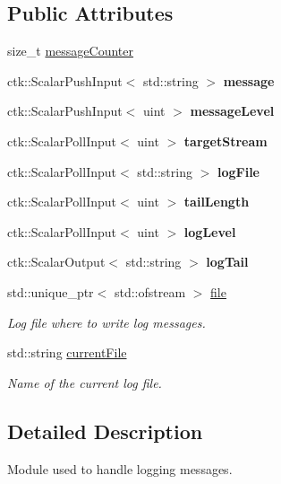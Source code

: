 \subsection*{Public Attributes}
\begin{DoxyCompactItemize}
\item 
size\+\_\+t \hyperlink{structLoggingModule_a30626e4224e872a8b8ea94f4b3df810f}{message\+Counter}
\item 
ctk\+::\+Scalar\+Push\+Input$<$ std\+::string $>$ {\bfseries message}
\item 
ctk\+::\+Scalar\+Push\+Input$<$ uint $>$ {\bfseries message\+Level}
\item 
ctk\+::\+Scalar\+Poll\+Input$<$ uint $>$ {\bfseries target\+Stream}
\item 
ctk\+::\+Scalar\+Poll\+Input$<$ std\+::string $>$ {\bfseries log\+File}
\item 
ctk\+::\+Scalar\+Poll\+Input$<$ uint $>$ {\bfseries tail\+Length}
\item 
ctk\+::\+Scalar\+Poll\+Input$<$ uint $>$ {\bfseries log\+Level}
\item 
ctk\+::\+Scalar\+Output$<$ std\+::string $>$ {\bfseries log\+Tail}
\item 
std\+::unique\+\_\+ptr$<$ std\+::ofstream $>$ \hyperlink{structLoggingModule_a600659a6a9219f9123ae1fd7b2f43826}{file}\hypertarget{structLoggingModule_a600659a6a9219f9123ae1fd7b2f43826}{}\label{structLoggingModule_a600659a6a9219f9123ae1fd7b2f43826}

\begin{DoxyCompactList}\small\item\em Log file where to write log messages. \end{DoxyCompactList}\item 
std\+::string \hyperlink{structLoggingModule_adcc76afe247ea00966077346c10258eb}{current\+File}\hypertarget{structLoggingModule_adcc76afe247ea00966077346c10258eb}{}\label{structLoggingModule_adcc76afe247ea00966077346c10258eb}

\begin{DoxyCompactList}\small\item\em Name of the current log file. \end{DoxyCompactList}\end{DoxyCompactItemize}


\subsection{Detailed Description}
Module used to handle logging messages. 

